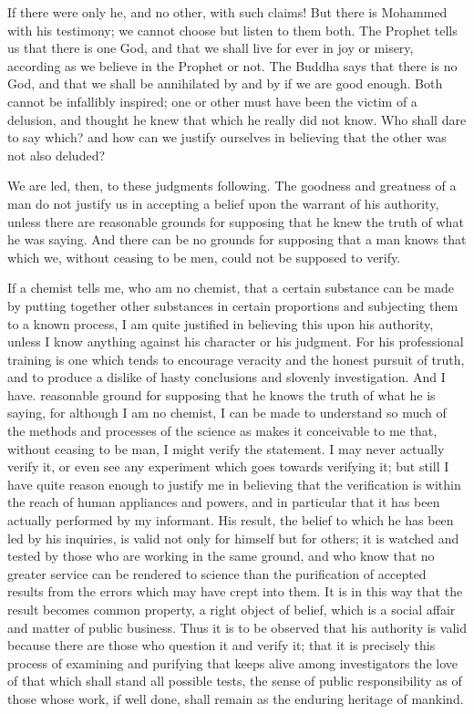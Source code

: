 \documentclass[12pt]{article}
\begin{document}
If there were only he, and no other, with such claims! But there is Mohammed with his testimony; we cannot choose but listen to them both. The Prophet tells us that there is one God, and that we shall live for ever in joy or misery, according as we believe in the Prophet or not. The Buddha says that there is no God, and that we shall be annihilated by and by if we are good enough. Both cannot be infallibly inspired; one or other must have been the victim of a delusion, and thought he knew that which he really did not know. Who shall dare to say which? and how can we justify ourselves in believing that the other was not also deluded?

We are led, then, to these judgments following. The goodness and greatness of a man do not justify us in accepting a belief upon the warrant of his authority, unless there are reasonable grounds for supposing that he knew the truth of what he was saying. And there can be no grounds for supposing that a man knows that which we, without ceasing to be men, could not be supposed to verify.

If a chemist tells me, who am no chemist, that a certain substance can be made by putting together other substances in certain proportions and subjecting them to a known process, I am quite justified in believing this upon his authority, unless I know anything against his character or his judgment. For his professional training is one which tends to encourage veracity and the honest pursuit of truth, and to produce a dislike of hasty conclusions and slovenly investigation. And I have. reasonable ground for supposing that he knows the truth of what he is saying, for although I am no chemist, I can be made to understand so much of the methods and processes of the science as makes it conceivable to me that, without ceasing to be man, I might verify the statement. I may never actually verify it, or even see any experiment which goes towards verifying it; but still I have quite reason enough to justify me in believing that the verification is within the reach of human appliances and powers, and in particular that it has been actually performed by my informant. His result, the belief to which he has been led by his inquiries, is valid not only for himself but for others; it is watched and tested by those who are working in the same ground, and who know that no greater service can be rendered to science than the purification of accepted results from the errors which may have crept into them. It is in this way that the result becomes common property, a right object of belief, which is a social affair and matter of public business. Thus it is to be observed that his authority is valid because there are those who question it and verify it; that it is precisely this process of examining and purifying that keeps alive among investigators the love of that which shall stand all possible tests, the sense of public responsibility as of those whose work, if well done, shall remain as the enduring heritage of mankind.
\end{document}
